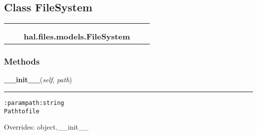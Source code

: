 
\subsection{Class FileSystem}

    \label{hal:files:models:FileSystem}
\begin{tabular}{cccccc}
\multicolumn{2}{r}{\settowidth{\BCL}{object}\multirow{2}{\BCL}{object}}
&&
  \\\cline{3-3}
  &&\multicolumn{1}{c|}{}
&&
  \\
&&\multicolumn{2}{l}{\textbf{hal.files.models.FileSystem}}
\end{tabular}



  \subsubsection{Methods}

    \vspace{0.5ex}

\hspace{.8\funcindent}\begin{boxedminipage}{\funcwidth}

    \raggedright \textbf{\_\_init\_\_}(\textit{self}, \textit{path})

    \vspace{-1.5ex}

    \rule{\textwidth}{0.5\fboxrule}
\setlength{\parskip}{2ex}
\begin{alltt}

:param path: string
    Path to file
\end{alltt}

\setlength{\parskip}{1ex}
      Overrides: object.\_\_init\_\_

    \end{boxedminipage}

